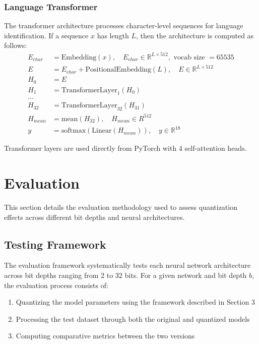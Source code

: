\documentclass[twocolumn]{article}
\begin{document}
\subsubsection{Language Transformer}
The transformer architecture processes character-level sequences for language
identification. If a sequence $x$ has length $L$, then the architecture is
computed as follows:
\begin{align*}
E_{char} &= \text{Embedding}(x), \quad E_{char} \in \mathbb{R}^{L \times 512}, \text{ vocab size } = 65535 \nonumber \\
E &= E_{char} + \text{PositionalEmbedding}(L), \quad E \in \mathbb{R}^{L \times 512} \\
H_0 &= E \\
H_1 &= \text{TransformerLayer}_1(H_{0}) \\
... \\
H_{32} &= \text{TransformerLayer}_{32}(H_{31}) \\
H_{mean} &= \text{mean}(H_{32}), \quad H_{mean} \in R^{512} \\
y &= \text{softmax}(\text{Linear}(H_{mean})), \quad y \in \mathbb{R}^{18}
\end{align*}

Transformer layers are used directly from PyTorch with 4 self-attention heads.

\section{Evaluation}
This section details the evaluation methodology used to assess quantization effects across different bit depths and neural architectures.

\subsection{Testing Framework}
The evaluation framework systematically tests each neural network architecture across bit depths ranging from 2 to 32 bits. For a given network and bit depth $b$, the evaluation process consists of:
\begin{enumerate}
\item Quantizing the model parameters using the framework described in Section 3
\item Processing the test dataset through both the original and quantized models
\item Computing comparative metrics between the two versions
\end{enumerate}
\end{document}

